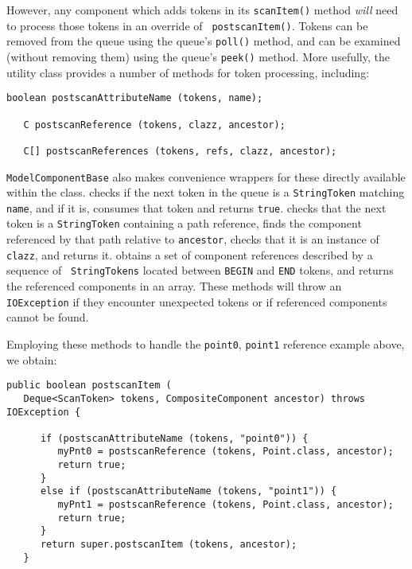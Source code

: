 \documentclass{article}
\begin{document}
However, any component which adds tokens in its {\tt scanItem()}
method {\it will} need to process those tokens in an override of {\tt
postscanItem()}. Tokens can be removed from the queue using
the queue's {\tt poll()} method, and can be examined (without removing
them) using the queue's {\tt peek()} method. More usefully, 
the utility class 
 provides
a number of methods for token processing, including:
\begin{lstlisting}[]
   boolean postscanAttributeName (tokens, name);

   C postscanReference (tokens, clazz, ancestor);

   C[] postscanReferences (tokens, refs, clazz, ancestor);
\end{lstlisting}
{\tt ModelComponentBase} also makes convenience wrappers for these
directly available within the class.
checks if the next token in the queue is a {\tt StringToken} matching
{\tt name}, and if it is, consumes that token and returns {\tt true}.
checks that the next token is a {\tt StringToken} containing a path
reference, finds the component referenced by that path relative to
{\tt ancestor}, checks that it is an instance of {\tt clazz}, and
returns it.
obtains a set of component references described by a sequence of {\tt
StringTokens} located between {\tt BEGIN} and {\tt END} tokens, and
returns the referenced components in an array.  These methods will
throw an {\tt IOException} if they encounter unexpected tokens or if
referenced components cannot be found.

Employing these methods to handle the 
{\tt point0}, {\tt point1} reference example above, we obtain:
\begin{lstlisting}[]
   public boolean postscanItem (
   Deque<ScanToken> tokens, CompositeComponent ancestor) throws IOException {

      if (postscanAttributeName (tokens, "point0")) {
         myPnt0 = postscanReference (tokens, Point.class, ancestor);
         return true;
      }
      else if (postscanAttributeName (tokens, "point1")) {
         myPnt1 = postscanReference (tokens, Point.class, ancestor);
         return true;
      }
      return super.postscanItem (tokens, ancestor);
   }
\end{lstlisting}
\end{document}
